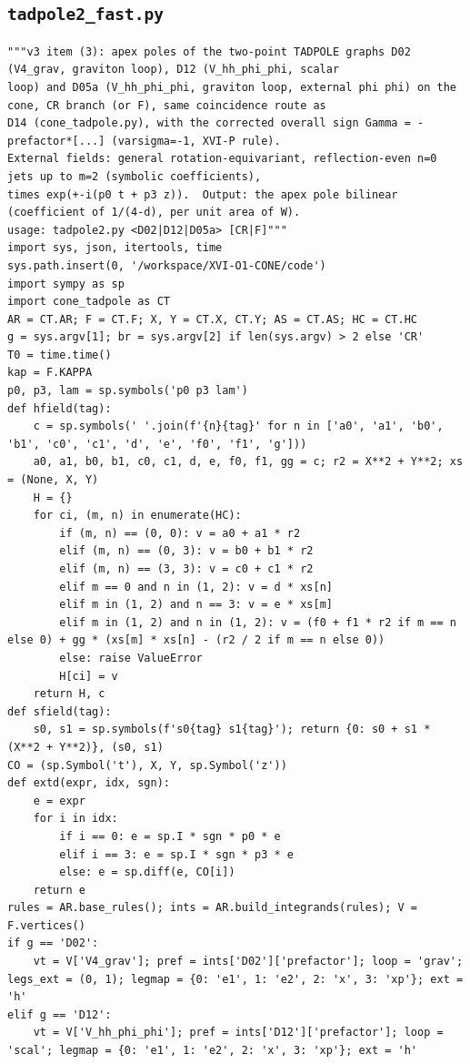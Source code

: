 \documentclass[10pt]{article}
\begin{document}
\subsection{\texttt{tadpole2\_fast.py}}
\begin{lstlisting}
"""v3 item (3): apex poles of the two-point TADPOLE graphs D02 (V4_grav, graviton loop), D12 (V_hh_phi_phi, scalar
loop) and D05a (V_hh_phi_phi, graviton loop, external phi phi) on the cone, CR branch (or F), same coincidence route as
D14 (cone_tadpole.py), with the corrected overall sign Gamma = -prefactor*[...] (varsigma=-1, XVI-P rule).
External fields: general rotation-equivariant, reflection-even n=0 jets up to m=2 (symbolic coefficients),
times exp(+-i(p0 t + p3 z)).  Output: the apex pole bilinear (coefficient of 1/(4-d), per unit area of W).
usage: tadpole2.py <D02|D12|D05a> [CR|F]"""
import sys, json, itertools, time
sys.path.insert(0, '/workspace/XVI-O1-CONE/code')
import sympy as sp
import cone_tadpole as CT
AR = CT.AR; F = CT.F; X, Y = CT.X, CT.Y; AS = CT.AS; HC = CT.HC
g = sys.argv[1]; br = sys.argv[2] if len(sys.argv) > 2 else 'CR'
T0 = time.time()
kap = F.KAPPA
p0, p3, lam = sp.symbols('p0 p3 lam')
def hfield(tag):
    c = sp.symbols(' '.join(f'{n}{tag}' for n in ['a0', 'a1', 'b0', 'b1', 'c0', 'c1', 'd', 'e', 'f0', 'f1', 'g']))
    a0, a1, b0, b1, c0, c1, d, e, f0, f1, gg = c; r2 = X**2 + Y**2; xs = (None, X, Y)
    H = {}
    for ci, (m, n) in enumerate(HC):
        if (m, n) == (0, 0): v = a0 + a1 * r2
        elif (m, n) == (0, 3): v = b0 + b1 * r2
        elif (m, n) == (3, 3): v = c0 + c1 * r2
        elif m == 0 and n in (1, 2): v = d * xs[n]
        elif m in (1, 2) and n == 3: v = e * xs[m]
        elif m in (1, 2) and n in (1, 2): v = (f0 + f1 * r2 if m == n else 0) + gg * (xs[m] * xs[n] - (r2 / 2 if m == n else 0))
        else: raise ValueError
        H[ci] = v
    return H, c
def sfield(tag):
    s0, s1 = sp.symbols(f's0{tag} s1{tag}'); return {0: s0 + s1 * (X**2 + Y**2)}, (s0, s1)
CO = (sp.Symbol('t'), X, Y, sp.Symbol('z'))
def extd(expr, idx, sgn):
    e = expr
    for i in idx:
        if i == 0: e = sp.I * sgn * p0 * e
        elif i == 3: e = sp.I * sgn * p3 * e
        else: e = sp.diff(e, CO[i])
    return e
rules = AR.base_rules(); ints = AR.build_integrands(rules); V = F.vertices()
if g == 'D02':
    vt = V['V4_grav']; pref = ints['D02']['prefactor']; loop = 'grav'; legs_ext = (0, 1); legmap = {0: 'e1', 1: 'e2', 2: 'x', 3: 'xp'}; ext = 'h'
elif g == 'D12':
    vt = V['V_hh_phi_phi']; pref = ints['D12']['prefactor']; loop = 'scal'; legmap = {0: 'e1', 1: 'e2', 2: 'x', 3: 'xp'}; ext = 'h'

\end{lstlisting}
\end{document}
